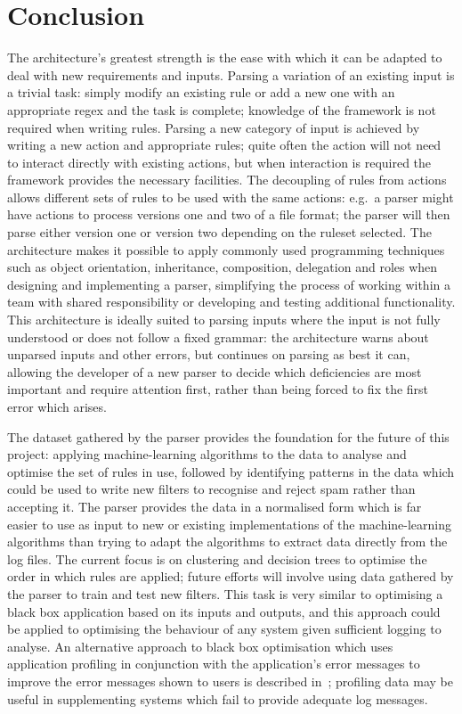 \documentclass[draft]{svmult}
\begin{document}
\section{Conclusion}

The architecture's greatest strength is the ease with which it can be
adapted to deal with new requirements and inputs.  Parsing a variation of
an existing input is a trivial task: simply modify an existing rule or add
a new one with an appropriate regex and the task is complete; knowledge of
the framework is not required when writing rules.  Parsing a new category
of input is achieved by writing a new action and appropriate rules; quite
often the action will not need to interact directly with existing actions,
but when interaction is required the framework provides the necessary
facilities.  The decoupling of rules from actions allows different sets of
rules to be used with the same actions: e.g.\ a parser might have actions
to process versions one and two of a file format; the parser will then
parse either version one or version two depending on the ruleset selected.
The architecture makes it possible to apply commonly used programming
techniques such as object orientation, inheritance, composition, delegation
and roles when designing and implementing a parser, simplifying the process
of working within a team with shared responsibility or developing and
testing additional functionality.  This architecture is ideally suited to
parsing inputs where the input is not fully understood or does not follow a
fixed grammar: the architecture warns about unparsed inputs and other
errors, but continues on parsing as best it can, allowing the developer of
a new parser to decide which deficiencies are most important and require
attention first, rather than being forced to fix the first error which
arises.

The dataset gathered by the parser provides the foundation for the future
of this project: applying machine-learning algorithms to the data to
analyse and optimise the set of rules in use, followed by identifying
patterns in the data which could be used to write new filters to recognise
and reject spam rather than accepting it.  The parser provides the data in
a normalised form which is far easier to use as input to new or existing
implementations of the machine-learning algorithms than trying to adapt the
algorithms to extract data directly from the log files.  The current focus
is on clustering and decision trees to optimise the order in which rules
are applied; future efforts will involve using data gathered by the parser
to train and test new filters.  This task is very similar to optimising a
black box application based on its inputs and outputs, and this approach
could be applied to optimising the behaviour of any system given sufficient
logging to analyse.  An alternative approach to black box optimisation
which uses application profiling in conjunction with the application's
error messages to improve the error messages shown to users is described
in~\cite{black-box-error-reporting}; profiling data may be useful in
supplementing systems which fail to provide adequate log messages.
\end{document}
